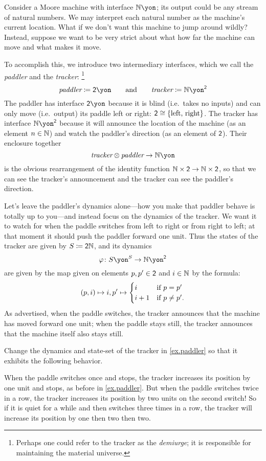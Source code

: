 \documentclass[Book-Poly]{subfiles}
\begin{document}
\begin{example}[Paddling]\label{ex.paddler}
Consider a Moore machine with interface $\nn\yon$; its output could be any stream of natural numbers.
We may interpret each natural number as the machine's current location.
What if we don't want this machine to jump around wildly?
Instead, suppose we want to be very strict about what how far the machine can move and what makes it move.

To accomplish this, we introduce two intermediary interfaces, which we call the \emph{paddler} and the \emph{tracker}:%
\footnote{Perhaps one could refer to the tracker as the \emph{demiurge}; it is responsible for maintaining the material universe.}
\[
  \textit{paddler}\coloneqq\2\yon
  \qqand
  \textit{tracker}\coloneqq\nn\yon^\2
\]
The paddler has interface $\2\yon$ because it is blind (i.e.\ takes no inputs) and can only move (i.e.\ output) its paddle left or right: $\textsf{2}\cong\{\text{left, right}\}$. The tracker has interface $\nn\yon^\2$ because it will announce the location of the machine (as an element $n\in\mathbb{N}$) and watch the paddler's direction (as an element of $\textsf{2}$). Their enclosure together
\[
\textit{tracker}\otimes\textit{paddler}\to\nn\yon
\]
is the obvious rearrangement of the identity function $\mathbb{N}\times\textsf{2}\to\mathbb{N}\times\textsf{2}$, so that we can see the tracker's announcement and the tracker can see the paddler's direction.

Let's leave the paddler's dynamics alone---how you make that paddler behave is totally up to you---and instead focus on the dynamics of the tracker. We want it to watch for when the paddle switches from left to right or from right to left; at that moment it should push the paddler forward one unit. Thus the states of the tracker are given by $S\coloneqq\textsf{2}\mathbb{N}$, and its dynamics
\[\varphi\colon S\yon^S\to\nn\yon^\2\]
are given by the map given on elements $p,p'\in\textsf{2}$ and $i\in\mathbb{N}$ by the formula:
\[
  (p,i)\mapsto i,p'\mapsto
	\begin{cases}
		i&\textnormal{if }p=p'\\
		i+1&\textnormal{if }p\neq p'.
	\end{cases}
\]
As advertised, when the paddle switches, the tracker announces that the machine has moved forward one unit; when the paddle stays still, the tracker announces that the machine itself also stays still.
\end{example}

\begin{exercise}
Change the dynamics and state-set of the tracker in \cref{ex.paddler} so that it exhibits the following behavior.

When the paddle switches once and stops, the tracker increases its position by one unit and stops, as before in \cref{ex.paddler}. But when the paddle switches twice in a row, the tracker increases its position by two units on the second switch! So if it is quiet for a while and then switches three times in a row, the tracker will increase its position by one then two then two.
\end{exercise}
\end{document}
